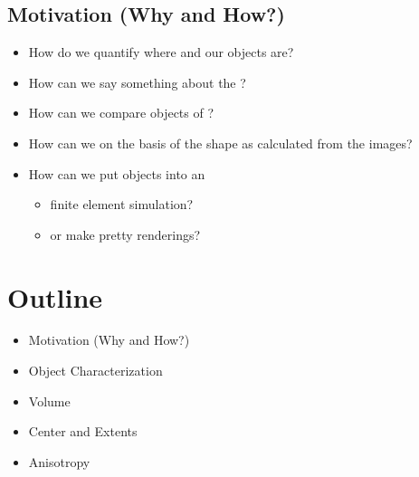 \documentclass[letterpaper,10pt,english]{sphinxmanual}
\begin{document}
\subsection{Motivation (Why and How?)}
\label{\detokenize{06-ShapeAnalysis:motivation-why-and-how}}\begin{itemize}
\item {} 
\sphinxAtStartPar
How do we quantify where and  our objects are?

\item {} 
\sphinxAtStartPar
How can we say something about the ?

\item {} 
\sphinxAtStartPar
How can we compare objects of ?

\item {} 
\sphinxAtStartPar
How can we  on the basis of the shape as calculated from the images?

\item {} 
\sphinxAtStartPar
How can we put objects into an
\begin{itemize}
\item {} 
\sphinxAtStartPar
finite element simulation?

\item {} 
\sphinxAtStartPar
or make pretty renderings?

\end{itemize}

\end{itemize}


\section{Outline}
\label{\detokenize{06-ShapeAnalysis:outline}}\begin{itemize}
\item {} 
\sphinxAtStartPar
Motivation (Why and How?)

\item {} 
\sphinxAtStartPar
Object Characterization

\item {} 
\sphinxAtStartPar
Volume

\item {} 
\sphinxAtStartPar
Center and Extents

\item {} 
\sphinxAtStartPar
Anisotropy

\end{itemize}
\end{document}
